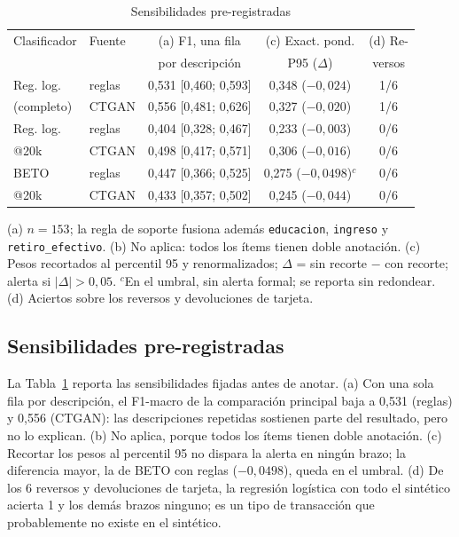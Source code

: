 \documentclass[journal]{IEEEtai}
\begin{document}
\begin{table}[!t]
\caption{Sensibilidades pre-registradas}
\label{tab:sensibilidades}
\centering
\footnotesize
\setlength{\tabcolsep}{3pt}
\begin{tabular}{llccc}
\toprule
Clasificador & Fuente & (a) F1, una fila & (c) Exact. pond. & (d) Re- \\
 & & por descripción & P95 ($\Delta$) & versos \\
\midrule
Reg. log. & reglas & 0{,}531 [0{,}460; 0{,}593] & 0{,}348 ($-0{,}024$) & 1/6 \\
(completo) & CTGAN & 0{,}556 [0{,}481; 0{,}626] & 0{,}327 ($-0{,}020$) & 1/6 \\
Reg. log. & reglas & 0{,}404 [0{,}328; 0{,}467] & 0{,}233 ($-0{,}003$) & 0/6 \\
@20k & CTGAN & 0{,}498 [0{,}417; 0{,}571] & 0{,}306 ($-0{,}016$) & 0/6 \\
BETO & reglas & 0{,}447 [0{,}366; 0{,}525] & 0{,}275 ($-0{,}0498$)$^{c}$ & 0/6 \\
@20k & CTGAN & 0{,}433 [0{,}357; 0{,}502] & 0{,}245 ($-0{,}044$) & 0/6 \\
\bottomrule
\end{tabular}
\par\smallskip\footnotesize (a) $n=153$; la regla de soporte fusiona además \texttt{educacion}, \texttt{ingreso} y \texttt{retiro\_efectivo}. (b) No aplica: todos los ítems tienen doble anotación. (c) Pesos recortados al percentil 95 y renormalizados; $\Delta$ = sin recorte $-$ con recorte; alerta si $|\Delta|>0{,}05$. $^{c}$En el umbral, sin alerta formal; se reporta sin redondear. (d) Aciertos sobre los reversos y devoluciones de tarjeta.
\end{table}

\subsection{Sensibilidades pre-registradas}
La Tabla~\ref{tab:sensibilidades} reporta las sensibilidades fijadas antes de anotar. (a) Con una sola fila por descripción, el F1-macro de la comparación principal baja a 0{,}531 (reglas) y 0{,}556 (CTGAN): las descripciones repetidas sostienen parte del resultado, pero no lo explican. (b) No aplica, porque todos los ítems tienen doble anotación. (c) Recortar los pesos al percentil 95 no dispara la alerta en ningún brazo; la diferencia mayor, la de BETO con reglas ($-0{,}0498$), queda en el umbral. (d) De los 6 reversos y devoluciones de tarjeta, la regresión logística con todo el sintético acierta 1 y los demás brazos ninguno; es un tipo de transacción que probablemente no existe en el sintético.
\end{document}
